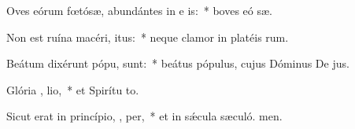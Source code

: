 \item Oves eórum fœtósæ, abundántes in e is:~* boves eó sæ.
\item Non est ruína macéri,  itus:~* neque clamor in platéis rum.
\item Beátum dixérunt pópu,   sunt:~* beátus pópulus, cujus Dóminus De jus.
\item Glória ,  lio,~* et Spirítu to.
\item Sicut erat in princípio,  ,  per,~* et in sǽcula sæculó. men.
